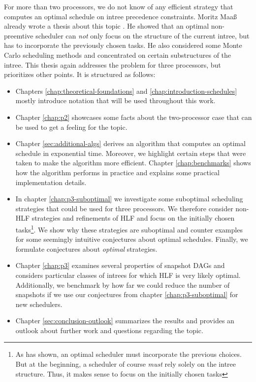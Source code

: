 For more than two processors, we do not know of any efficient strategy that computes an optimal schedule on intree precedence constraints. Moritz Maaß already wrote a thesis about this topic \cite{MoritzMaasDiploma}. He showed that an optimal non-preemtive scheduler can \emph{not} only focus on the structure of the current intree, but has to incorporate the previously chosen tasks. He also considered some Monte Carlo scheduling methods and concentrated on certain substructures of the intree. This thesis again addresses the problem for three processors, but prioritizes other points. It is structured as follows:

\begin{itemize}
\item Chapters \ref{chap:theoretical-foundations} and \ref{chap:introduction-schedules} mostly introduce notation that will be used throughout this work. 
\item Chapter \ref{chap:p2} showcases some facts about the two-processor case that can be used to get a feeling for the topic.
\item Chapter \ref{sec:additional-algs} derives an algorithm that computes an optimal schedule in exponential time. Moreover, we highlight certain steps that were taken to make the algorithm more efficient. Chapter \ref{chap:benchmarks} shows how the algorithm performs in practice and explains some practical implementation details.
\item In chapter \ref{chap:p3-suboptimal} we investigate some suboptimal scheduling strategies that could be used for three processors. We therefore consider non-HLF strategies and refinements of HLF and focus on the initially chosen tasks\footnote{As \cite{MoritzMaasDiploma} has shown, an optimal scheduler must incorporate the previous choices. But at the beginning, a scheduler of course \emph{must} rely solely on the intree structure. Thus, it makes sense to focus on the initially chosen tasks}. We show why these strategies are suboptimal and counter examples for some seemingly intuitive conjectures about optimal schedules. Finally, we formulate conjectures about \emph{optimal} strategies.
\item Chapter \ref{chap:p3} examines several properties of snapshot DAGs and considers particular classes of intrees for which HLF is very likely optimal. Additionally, we benchmark by how far we could reduce the number of snapshots if we use our conjectures from chapter \ref{chap:p3-suboptimal} for new schedulers.
\item Chapter \ref{sec:conclusion-outlook} summarizes the results and provides an outlook about further work and questions regarding the topic.
\end{itemize}

